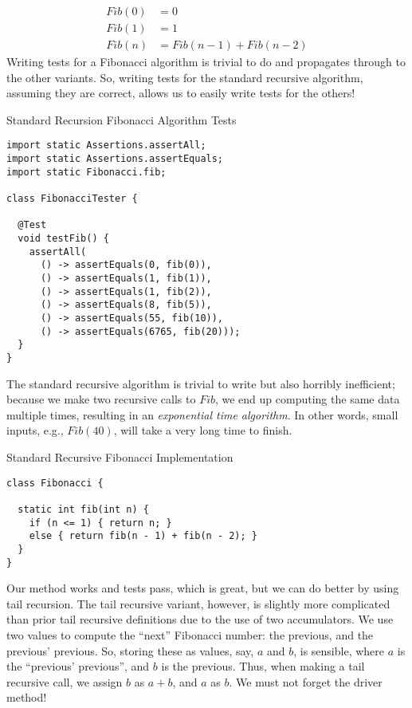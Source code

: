 \begin{align*}
  \textit{Fib}(0) &= 0\\
  \textit{Fib}(1) &= 1\\
  \textit{Fib}(n) &= \textit{Fib}(n - 1) + \textit{Fib}(n - 2)
\end{align*}
Writing tests for a Fibonacci algorithm is trivial to do and propagates through to the other variants. So, writing tests for the standard recursive algorithm, assuming they are correct, allows us to easily write tests for the others!

\begin{cl}[]{Standard Recursion Fibonacci Algorithm Tests}
\begin{lstlisting}[language=MyJava]
import static Assertions.assertAll;
import static Assertions.assertEquals;
import static Fibonacci.fib;

class FibonacciTester {

  @Test
  void testFib() {
    assertAll(
      () -> assertEquals(0, fib(0)),
      () -> assertEquals(1, fib(1)),
      () -> assertEquals(1, fib(2)),
      () -> assertEquals(8, fib(5)),
      () -> assertEquals(55, fib(10)),
      () -> assertEquals(6765, fib(20)));
  }
}
\end{lstlisting}
\end{cl}

The standard recursive algorithm is trivial to write but also horribly inefficient; because we make two recursive calls to $\textit{Fib}$, we end up computing the same data multiple times, resulting in an \textit{exponential time algorithm}. In other words, small inputs, e.g., $\textit{Fib}(40)$, will take a very long time to finish.

\begin{cl}[]{Standard Recursive Fibonacci Implementation}
\begin{lstlisting}[language=MyJava]
class Fibonacci {

  static int fib(int n) {
    if (n <= 1) { return n; } 
    else { return fib(n - 1) + fib(n - 2); }
  }
}
\end{lstlisting}
\end{cl}

Our method works and tests pass, which is great, but we can do better by using tail recursion. The tail recursive variant, however, is slightly more complicated than prior tail recursive definitions due to the use of two accumulators. We use two values to compute the ``next'' Fibonacci number: the previous, and the previous' previous. So, storing these as values, say, $a$ and $b$, is sensible, where $a$ is the ``previous' previous'', and $b$ is the previous. Thus, when making a tail recursive call, we assign $b$ as $a + b$, and $a$ as $b$. We must not forget the driver method!

